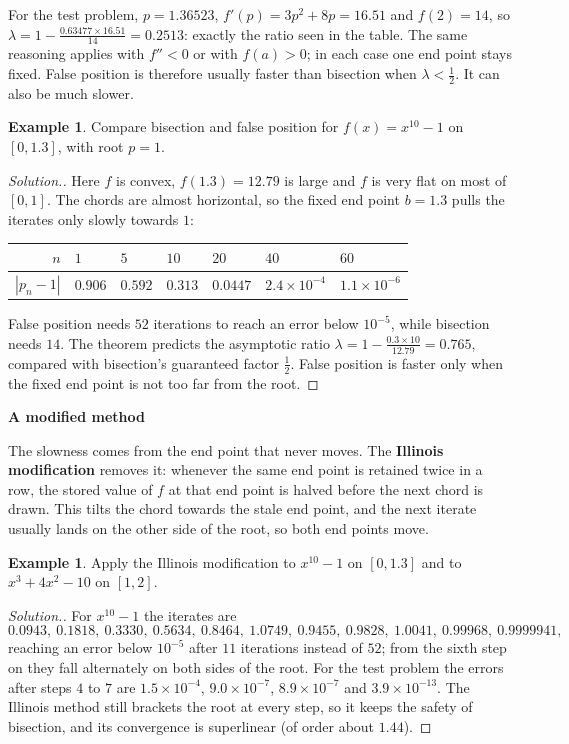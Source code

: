 \documentclass[11pt,a4paper]{article}
\numberwithin{equation}{section}
\theoremstyle{definition}
\newtheorem{exa}[thm]{Example}
\newenvironment{solution}
  {\renewcommand{\qedsymbol}{}\begin{proof}[\textit{Solution}.]}
  {\end{proof}}
\newcommand{\subhead}[1]{%
  \par\medskip\noindent\textbf{#1}\par\nobreak\smallskip}
\begin{document}
For the test problem, $p = 1.36523$, $f'(p) = 3p^2+8p = 16.51$ and $f(2) = 14$, so $\lambda = 1-\frac{0.63477\times16.51}{14} =
0.2513$: exactly the ratio seen in the table. The same reasoning applies with $f''<0$ or with $f(a)>0$; in each case one end point stays
fixed. False position is therefore usually faster than bisection when $\lambda<\frac12$. It can also be much slower.

\begin{exa}
\label{exa:x10}
Compare bisection and false position for $f(x) = x^{10}-1$ on $[0,1.3]$, with root $p = 1$.
\end{exa}

\begin{solution}
Here $f$ is convex, $f(1.3) = 12.79$ is large and $f$ is very flat on most of $[0,1]$. The chords are almost horizontal, so the fixed end
point $b = 1.3$ pulls the iterates only slowly towards $1$:
\begin{center}
\begin{tabular}{rllllll}
\hline
$n$ & $1$ & $5$ & $10$ & $20$ & $40$ & $60$\\
\hline
$|p_n-1|$ & $0.906$ & $0.592$ & $0.313$ & $0.0447$ & $2.4\times10^{-4}$ & $1.1\times10^{-6}$\\
\hline
\end{tabular}
\end{center}
False position needs $52$ iterations to reach an error below $10^{-5}$, while bisection needs $14$. The theorem predicts the asymptotic
ratio $\lambda = 1-\frac{0.3\times10}{12.79} = 0.765$, compared with bisection's guaranteed factor $\frac12$. False position is faster only
when the fixed end point is not too far from the root.
\end{solution}

\subhead{A modified method}
The slowness comes from the end point that never moves. The \textbf{Illinois modification} removes it: whenever the same end point is
retained twice in a row, the stored value of $f$ at that end point is halved before the next chord is drawn. This tilts the chord
towards the stale end point, and the next iterate usually lands on the other side of the root, so both end points move.

\begin{exa}
Apply the Illinois modification to $x^{10}-1$ on $[0,1.3]$ and to $x^3+4x^2-10$ on $[1,2]$.
\end{exa}

\begin{solution}
For $x^{10}-1$ the iterates are
$$0.0943,\ 0.1818,\ 0.3330,\ 0.5634,\ 0.8464,\ 1.0749,\ 0.9455,\ 0.9828,\ 1.0041,\ 0.99968,\ 0.9999941,$$
reaching an error below $10^{-5}$ after $11$ iterations instead of $52$; from the sixth step on they fall alternately on both sides of the
root. For the test problem the errors after steps $4$ to $7$ are $1.5\times10^{-4}$, $9.0\times10^{-7}$, $8.9\times10^{-7}$ and
$3.9\times10^{-13}$. The Illinois method still brackets the root at every step, so it keeps the safety of bisection, and its convergence is
superlinear (of order about $1.44$).
\end{solution}
\end{document}
